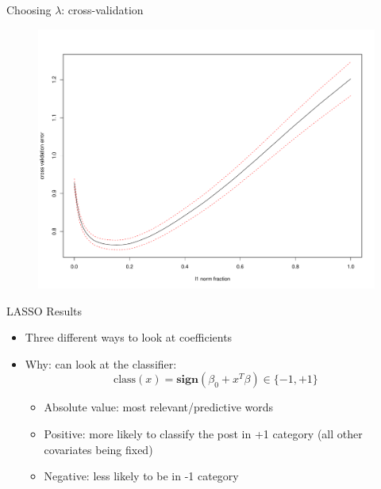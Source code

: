 \documentclass[12pt, trans]{beamer}
\newcommand{\1}[1]{{\mathbf 1}\left\{#1\right\}}        %
\begin{document}
\begin{frame}{Choosing $\lambda$: cross-validation}

\begin{figure}
  \centering
  \includegraphics[height=0.9\textheight]{./../../lassoResults/CVPosErr.pdf} 
\end{figure}

\end{frame}


\begin{frame}{LASSO Results} 

\begin{itemize}[<+->]
\item Three different ways to look at coefficients
\item Why: can look at the classifier:
\[
\text{class}(x) = \textbf{sign}(\beta_0+x^T\beta)\in\{-1,+1\}
\]
	\begin{itemize}
	\item Absolute value: most relevant/predictive words
	\item Positive: more likely to classify the post in +1 category (all other covariates being fixed)
	\item Negative: less likely to be in -1 category	
	\end{itemize}
	
\end{itemize}

\end{frame}
\end{document}
